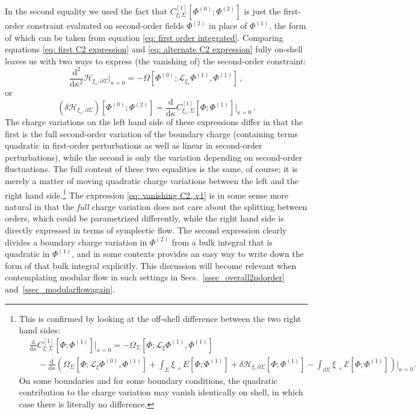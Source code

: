 \documentclass[]{jkpaper}
\theoremstyle{plain}
\theoremstyle{definition}
\newcommand{\sins}{\mathop{\lrcorner}}
\newcommand{\sd}{\mathrm {d}}
\newcommand{\fd}{\delta}
\newcommand{\sL}{\mathcal{L}}
\begin{document}
In the second equality we used the fact that $C^{[1]}_{\xi,\Sigma}\left[\Phi^{(0)};\Phi^{(2)}\right]$ is just the first-order constraint evaluated on second-order fields $\Phi^{(2)}$ in place of $\Phi^{(1)}$, the form of which can be taken from equation \eqref{eq: first order integrated}.
Comparing equations \eqref{eq: first C2 expression} and \eqref{eq: alternate C2 expression} fully on-shell leaves us with two ways to express (the vanishing of) the second-order constraint:
\begin{equation}\label{eq: vanishing C2, v1}
    \frac{\sd^2}{\sd\kappa^2}\mathcal{H}_{\xi_s,\partial\Sigma}\big|_{\kappa=0} = -\Omega\left[\Phi^{(0)};\sL_{\xi_s}\Phi^{(1)},\Phi^{(1)}\right]\,,
\end{equation}
or
\begin{equation}\label{eq: vanishing C2, v2}
    (\fd\mathcal{H}_{\xi_s,\partial\Sigma})\left[\Phi^{(0)};\Phi^{(2)}\right]=\frac{\sd}{\sd\kappa}C^{[1]}_{\xi_s,\Sigma}\left[\Phi;\Phi^{(1)}\right]\big|_{\kappa=0}\,.
\end{equation}
The charge variations on the left hand side of these expressions differ in that the first is the full second-order variation of the boundary charge (containing terms quadratic in first-order perturbations as well as linear in second-order perturbations), while the second is only the variation depending on second-order fluctuations.   The full content of these two equalities is the same, of course; it is merely a matter of moving quadratic charge variations between the left and the right hand side.\footnote{This is confirmed by looking at the off-shell difference between the two right hand sides:  
\begin{equation}\begin{split}
    &\frac{\sd}{\sd\kappa}C^{[1]}_{\xi;\Sigma}\left[\Phi;\Phi^{(1)}\right]\big|_{\kappa=0}
    =-\Omega_\Sigma\left[\Phi;\sL_\xi\Phi^{(1)},\Phi^{(1)}\right]
    \\
    &\quad-\frac{\sd}{\sd\kappa}\left(\Omega_\Sigma\left[\Phi;\sL_\xi\Phi^{(0)},\Phi^{(1)}\right]+\int_\Sigma \xi\sins E\left[\Phi;\Phi^{(1)}\right]+\delta \mathcal{H}_{\xi,\partial\Sigma}\left[\Phi;\Phi^{(1)}\right]-\int_{\partial\Sigma}\xi\sins \mathcal{E}\left[\Phi;\Phi^{(1)}\right]\right)\big|_{\kappa=0}.
\end{split}\end{equation}
On some boundaries and for some boundary conditions, the quadratic contribution to the charge variation may vanish identically on shell, in which case there is literally no difference.} 
The expression \eqref{eq: vanishing C2, v1} is in some sense more natural in that  the \textit{full} charge variation does not care about the splitting between orders, which could be parametrized differently, while the right hand side is directly expressed in terms of symplectic flow.  The second expression clearly divides a boundary charge variation in $\Phi^{(2)}$ from a bulk integral that is quadratic in $\Phi^{(1)}$, and in some contexts provides an easy way to write down the form of that bulk integral explicitly. This discussion will become relevant when contemplating modular flow in such settings in Secs.~\ref{ssec_overall2ndorder} and~\ref{ssec_modularflowagain}. 
\end{document}
